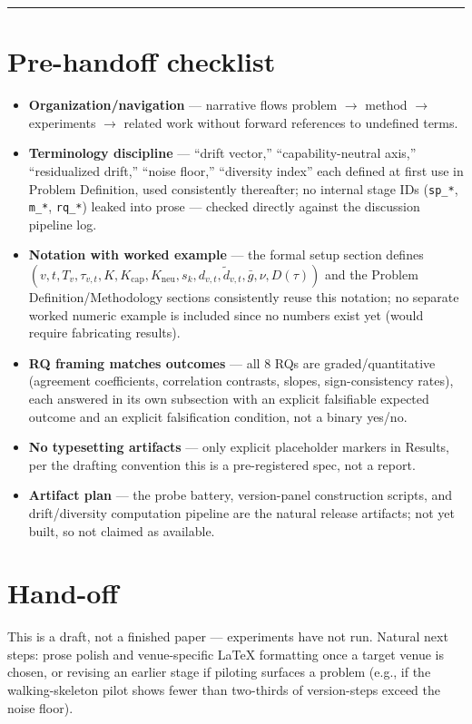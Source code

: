 \documentclass[11pt]{article}
\begin{document}
\vspace{1em}
\hrule
\vspace{1em}

\section*{Pre-handoff checklist}
\begin{itemize}[leftmargin=1.4em]
\item \textbf{Organization/navigation} --- narrative flows problem $\to$ method $\to$ experiments $\to$ related work without forward references to undefined terms.
\item \textbf{Terminology discipline} --- ``drift vector,'' ``capability-neutral axis,'' ``residualized drift,'' ``noise floor,'' ``diversity index'' each defined at first use in Problem Definition, used consistently thereafter; no internal stage IDs (\texttt{sp\_*}, \texttt{m\_*}, \texttt{rq\_*}) leaked into prose --- checked directly against the discussion pipeline log.
\item \textbf{Notation with worked example} --- the formal setup section defines $(v, t, T_v, \tau_{v,t}, K, K_{\text{cap}}, K_{\text{neu}}, s_k, d_{v,t}, \tilde{d}_{v,t}, \bar{g}, \nu, D(\tau))$ and the Problem Definition/Methodology sections consistently reuse this notation; no separate worked numeric example is included since no numbers exist yet (would require fabricating results).
\item \textbf{RQ framing matches outcomes} --- all 8 RQs are graded/quantitative (agreement coefficients, correlation contrasts, slopes, sign-consistency rates), each answered in its own subsection with an explicit falsifiable expected outcome and an explicit falsification condition, not a binary yes/no.
\item \textbf{No typesetting artifacts} --- only explicit placeholder markers in Results, per the drafting convention this is a pre-registered spec, not a report.
\item \textbf{Artifact plan} --- the probe battery, version-panel construction scripts, and drift/diversity computation pipeline are the natural release artifacts; not yet built, so not claimed as available.
\end{itemize}

\section*{Hand-off}
This is a draft, not a finished paper --- experiments have not run. Natural next steps: prose polish and venue-specific LaTeX formatting once a target venue is chosen, or revising an earlier stage if piloting surfaces a problem (e.g., if the walking-skeleton pilot shows fewer than two-thirds of version-steps exceed the noise floor).



\end{document}
